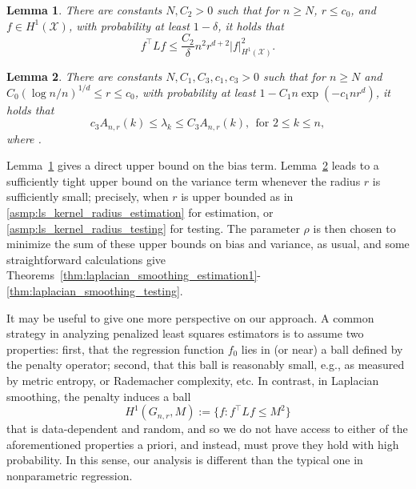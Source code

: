 \documentclass[twoside]{article}
\newcommand{\red}[1]{\textcolor{red}{#1}}
\newcommand{\green}[1]{\textcolor{green}{#1}}
\newcommand{\sbcomment}[1]{{\bf{{\red{{SB --- #1}}}}}}
\newcommand{\agcomment}[1]{{\bf{{\green{{AG --- #1}}}}}}
\newcommand{\1}{\mathbf{1}}
\newcommand{\Xset}{\mathcal{X}}
\newtheorem{lemma}{Lemma}
\theoremstyle{definition}
\theoremstyle{remark}
\begin{document}
\begin{lemma}
	\label{lem:graph_sobolev_seminorm}
	There are constants $N,C_2 > 0$ such that for $n \geq N$, $r \leq c_0$, and $f \in H^1(\Xset)$, with probability at least $1 - \delta$, it holds that
	\begin{equation}
	\label{eqn:graph_sobolev_seminorm}
	f^\top L f \leq \frac{C_2}{\delta} n^2 r^{d + 2} |f|_{H^1(\Xset)}^2.
	\end{equation}
\end{lemma}

\begin{lemma}
	\label{lem:neighborhood_eigenvalue} 
	There are constants $N,C_1,C_3,c_1,c_3 > 0$ such that for $n \geq N$ and $C_0(\log n/n)^{1/d} \leq r \leq c_0$, with probability at least $1 - C_1n\exp(-c_1nr^d)$, it holds that
	\begin{equation}
	\label{eqn:neighborhood_eigenvalue}
	c_3A_{n,r}(k) \leq \lambda_k \leq C_3A_{n,r}(k), ~~\textrm{for $2 \leq k \leq n$},
	\end{equation}
	where .
\end{lemma}

Lemma~\ref{lem:graph_sobolev_seminorm} gives a direct upper bound on the bias term. Lemma~\ref{lem:neighborhood_eigenvalue} leads to a sufficiently tight upper bound on the variance term whenever the radius $r$ is sufficiently small; precisely, when $r$ is upper bounded as in \ref{asmp:ls_kernel_radius_estimation} for estimation, or \ref{asmp:ls_kernel_radius_testing} for testing. The parameter $\rho$ is then chosen to minimize the sum of these upper bounds on bias and variance, as usual, and some straightforward calculations give Theorems~\ref{thm:laplacian_smoothing_estimation1}-\ref{thm:laplacian_smoothing_testing}.

It may be useful to give one more perspective on our approach. A common strategy in analyzing penalized least squares estimators is to assume two properties: first, that the regression function $f_0$ lies in (or near) a ball defined by the penalty operator; second, that this ball is reasonably small, e.g., as measured by metric entropy, or Rademacher complexity, etc. In contrast, in Laplacian smoothing, the penalty induces a ball
\begin{equation*}
H^1(G_{n,r},M) := \{f: f^\top L f \leq M^2\}
\end{equation*}
that is data-dependent and random, and so we do not have access to either of the aforementioned properties a priori, and instead, must prove they hold with high probability. In this sense, our analysis is different than the typical one in nonparametric regression.
\end{document}

